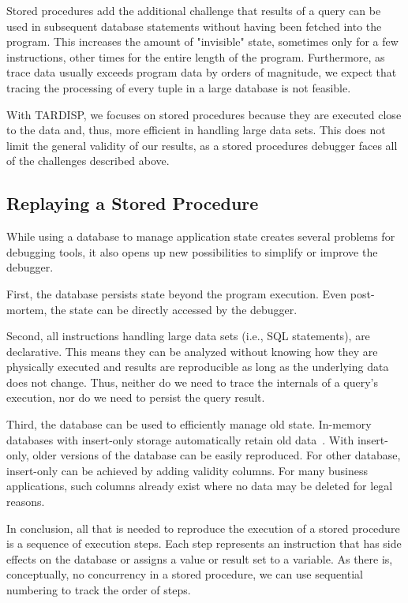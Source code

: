 \documentclass[english,conference]{IEEEtran}
\newcommand{\todo}[2][]{\pdfmargincomment[author={#1}]{#2}}
\newcommand{\tool}{TAR\-DISP}
\begin{document}
Stored procedures add the additional challenge that results of a query can be used in subsequent database statements without having been fetched into the program.
This increases the amount of "invisible" state, sometimes only for a few instructions, other times for the entire length of the program.
Furthermore, as trace data usually exceeds program data by orders of magnitude, we expect that tracing the processing of every tuple in a large database is not feasible.

With \tool, we focuses on stored procedures because they are executed close to the data and, thus, more efficient in handling large data sets.
This does not limit the general validity of our results, as a stored procedures debugger faces all of the challenges described above.

\subsection{Replaying a Stored Procedure}

While using a database to manage application state creates several problems for debugging tools, it also opens up new possibilities to simplify or improve the debugger.

First, the database persists state beyond the program execution.
Even post-mortem, the state can be directly accessed by the debugger.

Second, all instructions handling large data sets (i.e., SQL statements), are declarative.
This means they can be analyzed without knowing how they are physically executed and results are reproducible as long as the underlying data does not change.
Thus, neither do we need to trace the internals of a query's execution, nor do we need to persist the query result.
\todo{MP: This is not clear to me, yet.}

Third, the database can be used to efficiently manage old state.
In-memory databases with insert-only storage automatically retain old data~\cite{Plattner2009Acd}.
With insert-only, older versions of the database can be easily reproduced.
For other database, insert-only can be achieved by adding validity columns.
For many business applications, such columns already exist where no data may be deleted for legal reasons.

In conclusion, all that is needed to reproduce the execution of a stored procedure is a sequence of execution steps.
Each step represents an instruction that has side effects on the database or assigns a value or result set to a variable.
As there is, conceptually, no concurrency in a stored procedure, we can use sequential numbering to track the order of steps.
\end{document}
